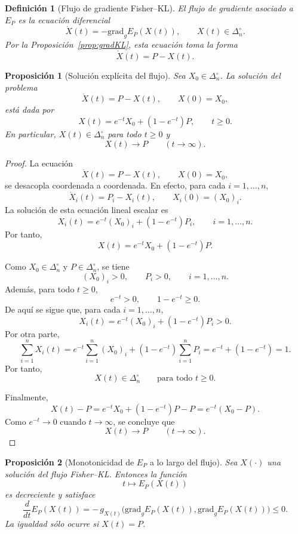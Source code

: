 \documentclass[12pt]{article}
\newtheorem{definicion}{Definición}[section]
\newtheorem{proposicion}{Proposición}[section]
\begin{document}
\begin{definicion}[Flujo de gradiente Fisher--KL]\label{def:flujoFisherKL}
El \emph{flujo de gradiente} asociado a $E_P$ es la ecuación diferencial
\[
\dot X(t)=-\mathrm{grad}_gE_P(X(t)),
\qquad
X(t)\in\Delta_n^\circ.
\]
Por la Proposición~\ref{prop:gradKL}, esta ecuación toma la forma
\[
\dot X(t)=P-X(t).
\]
\end{definicion}

\begin{proposicion}[Solución explícita del flujo]\label{prop:solucionExplicita}
Sea $X_0\in\Delta_n^\circ$. La solución del problema
\[
\dot X(t)=P-X(t),
\qquad
X(0)=X_0,
\]
está dada por
\[
X(t)=e^{-t}X_0+(1-e^{-t})P,
\qquad t\ge 0.
\]
En particular, $X(t)\in\Delta_n^\circ$ para todo $t\ge 0$ y
\[
X(t)\longrightarrow P
\qquad (t\to\infty).
\]
\end{proposicion}

\begin{proof}
La ecuación
\[
\dot X(t)=P-X(t),\qquad X(0)=X_0,
\]
se desacopla coordenada a coordenada. En efecto, para cada $i=1,\dots,n$,
\[
\dot X_i(t)=P_i-X_i(t),\qquad X_i(0)=(X_0)_i.
\]
La solución de esta ecuación lineal escalar es
\[
X_i(t)=e^{-t}(X_0)_i+(1-e^{-t})P_i,
\qquad i=1,\dots,n.
\]
Por tanto,
\[
X(t)=e^{-t}X_0+(1-e^{-t})P.
\]

Como $X_0\in\Delta_n^\circ$ y $P\in\Delta_n^\circ$, se tiene
\[
(X_0)_i>0,\qquad P_i>0,\qquad i=1,\dots,n.
\]
Además, para todo $t\ge 0$,
\[
e^{-t}>0,
\qquad
1-e^{-t}\ge 0.
\]
De aquí se sigue que, para cada $i=1,\dots,n$,
\[
X_i(t)=e^{-t}(X_0)_i+(1-e^{-t})P_i>0.
\]
Por otra parte,
\[
\sum_{i=1}^n X_i(t)
=
e^{-t}\sum_{i=1}^n (X_0)_i
+
(1-e^{-t})\sum_{i=1}^n P_i
=
e^{-t}+(1-e^{-t})
=
1.
\]
Por tanto,
\[
X(t)\in\Delta_n^\circ
\qquad \text{para todo } t\ge 0.
\]

Finalmente,
\[
X(t)-P
=
e^{-t}X_0+(1-e^{-t})P-P
=
e^{-t}(X_0-P).
\]
Como $e^{-t}\to 0$ cuando $t\to\infty$, se concluye que
\[
X(t)\to P
\qquad (t\to\infty).
\]
\end{proof}

\begin{proposicion}[Monotonicidad de $E_P$ a lo largo del flujo]\label{prop:Hteorema}
Sea $X(\cdot)$ una solución del flujo Fisher--KL. Entonces la función
\[
t\longmapsto E_P(X(t))
\]
es decreciente y satisface
\[
\frac{d}{dt}E_P(X(t))
=
-\,g_{X(t)}\!\bigl(\mathrm{grad}_gE_P(X(t)),\mathrm{grad}_gE_P(X(t))\bigr)
\le 0.
\]
La igualdad sólo ocurre si $X(t)=P$.
\end{proposicion}
\end{document}
